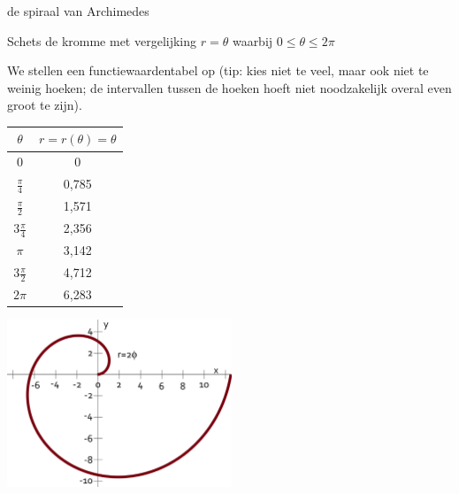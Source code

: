 \begin{voorbeeld}
	de spiraal van Archimedes

Schets de kromme met vergelijking $r=\theta$ waarbij $0\leq\theta\leq2\pi$

We stellen een functiewaardentabel op (tip: kies niet te veel, maar
ook niet te weinig hoeken; de intervallen tussen de hoeken hoeft niet
noodzakelijk overal even groot te zijn).

\begin{minipage}{.48\linewidth}
	\centering
	\begin{tabular}{c|c}
		$\theta$ & $r=r(\theta)=\theta$\\
		\hline 
		$0$ & 0\\
		$\frac{\pi}{4}$ & 0,785 \\
		$\frac{\pi}{2}$ & 1,571\\
		$3\frac{\pi}{4}$ & 2,356\\
		$\pi$ & 3,142\\
		$3\frac{\pi}{2}$ & 4,712\\
		$2\pi$ & 6,283\\
	\end{tabular}
\end{minipage}
\begin{minipage}{.48\linewidth}
\includegraphics[height=5cm]{2_elem_rekenvaardigheden_B/inputs/figuur8}
\end{minipage}

\end{voorbeeld}
